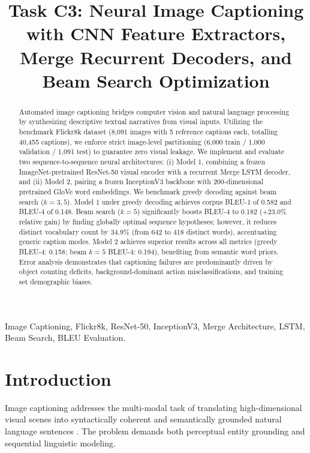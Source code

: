 \documentclass[conference]{IEEEtran}
\begin{document}
\title{Task C3: Neural Image Captioning with CNN Feature Extractors, Merge Recurrent Decoders, and Beam Search Optimization}

\author{
}

\maketitle

\begin{abstract}
Automated image captioning bridges computer vision and natural language processing by synthesizing descriptive textual narratives from visual inputs. Utilizing the benchmark Flickr8k dataset (8,091 images with 5 reference captions each, totalling 40,455 captions), we enforce strict image-level partitioning (6,000 train / 1,000 validation / 1,091 test) to guarantee zero visual leakage. We implement and evaluate two sequence-to-sequence neural architectures: (i) Model 1, combining a frozen ImageNet-pretrained ResNet-50 visual encoder with a recurrent Merge LSTM decoder, and (ii) Model 2, pairing a frozen InceptionV3 backbone with 200-dimensional pretrained GloVe word embeddings. We benchmark greedy decoding against beam search ($k=3, 5$). Model 1 under greedy decoding achieves corpus BLEU-1 of 0.582 and BLEU-4 of 0.148. Beam search ($k=5$) significantly boosts BLEU-4 to 0.182 (+23.0\% relative gain) by finding globally optimal sequence hypotheses; however, it reduces distinct vocabulary count by 34.9\% (from 642 to 418 distinct words), accentuating generic caption modes. Model 2 achieves superior results across all metrics (greedy BLEU-4: 0.158; beam $k=5$ BLEU-4: 0.194), benefiting from semantic word priors. Error analysis demonstrates that captioning failures are predominantly driven by object counting deficits, background-dominant action misclassifications, and training set demographic biases.
\end{abstract}

\begin{IEEEkeywords}
Image Captioning, Flickr8k, ResNet-50, InceptionV3, Merge Architecture, LSTM, Beam Search, BLEU Evaluation.
\end{IEEEkeywords}

\section{Introduction}
Image captioning addresses the multi-modal task of translating high-dimensional visual scenes into syntactically coherent and semantically grounded natural language sentences \cite{vinyals2015}. The problem demands both perceptual entity grounding and sequential linguistic modeling.
\end{document}
